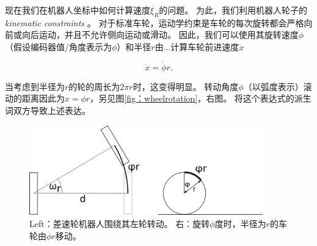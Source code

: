 现在我们在机器人坐标中如何计算速度$ \dot {\xi_R} $的问题。 为此，我们利用机器人轮子的\emph {kinematic constraints} 。 对于标准车轮，运动学约束是车轮的每次旋转都会严格向前或向后运动，并且不允许侧向运动或滑动。 因此，我们可以使用其旋转速度$ \dot {\phi} $（假设编码器值/角度表示为$ \phi $）和半径$ r $由...计算车轮前进速度$ \dot {x} $

\begin{equation}
\dot{x}=\dot{\phi}r.
\end{equation}

当考虑到半径为$ r $的轮的周长为$ 2 \pi r $时，这变得明显。 转动角度$ \phi $（以弧度表示）滚动的距离因此为$ x = \phi r $，另见图\ref {fig：wheelrotation}，右图。 将这个表达式的派生词双方导致上述表达。

\begin{figure}[htb!]
	\centering
		\includegraphics[width=0.9\textwidth]{figs/wheelrotation.png}
	\caption{Left：差速轮机器人围绕其左轮转动。 右：旋转$ \phi $度时，半径为$ r $的车轮由$ \phi r $移动。}
	\label{fig:wheelrotation}
\end{figure}



